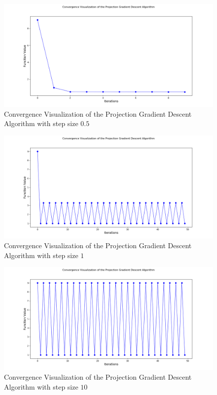 \documentclass[12pt, draftcls, onecolumn]{IEEEtran}
\begin{document}
\begin{figure}[t]
\includegraphics[width=1.0\textwidth]{PGD_Convergence_Gamma_Point5.png}
\caption{Convergence Visualization of the Projection Gradient Descent Algorithm with step size $0.5$}
\label{fig:mesh4}
\centering
\end{figure}
\begin{figure}[t]
\includegraphics[width=1.0\textwidth]{PGD_Convergence_Gamma_1.png}
\caption{Convergence Visualization of the Projection Gradient Descent Algorithm with step size $1$}
\label{fig:mesh5}
\centering
\end{figure}
\begin{figure}[t]
\includegraphics[width=1.0\textwidth]{PGD_Convergence_Gamma_10.png}
\caption{Convergence Visualization of the Projection Gradient Descent Algorithm with step size $10$}
\label{fig:mesh6}
\centering
\end{figure}
\end{document}
